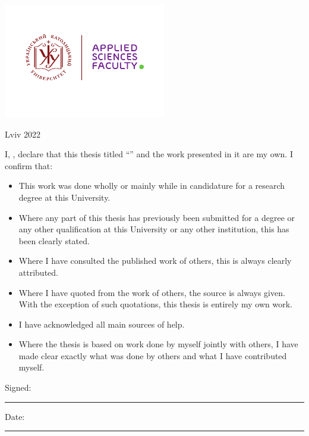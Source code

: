 \documentclass[
11pt, %
english, %
singlespacing, %
headsepline, %
]{BachelorMasterThesis} %
\begin{document}
\begin{titlepage}
\begin{center}
\vfill
\includegraphics[height=5cm]{UCU-Apps.png} %

\vfill
{\large \vspace{-0.5cm} Lviv 2022}\\[4cm] %
 
\vfill
\end{center}
\end{titlepage}


\begin{declaration}
\addchaptertocentry{\authorshipname} %
\noindent I, \authorname, declare that this thesis titled \enquote{\ttitle} and the work presented in it are my own. I confirm that:

\begin{itemize} 
\item This work was done wholly or mainly while in candidature for a research degree at this University.
\item Where any part of this thesis has previously been submitted for a degree or any other qualification at this University or any other institution, this has been clearly stated.
\item Where I have consulted the published work of others, this is always clearly attributed.
\item Where I have quoted from the work of others, the source is always given. With the exception of such quotations, this thesis is entirely my own work.
\item I have acknowledged all main sources of help.
\item Where the thesis is based on work done by myself jointly with others, I have made clear exactly what was done by others and what I have contributed myself.\\
\end{itemize}
 
\noindent Signed:\\
\rule[0.5em]{25em}{0.5pt} %
 
\noindent Date:\\
\rule[0.5em]{25em}{0.5pt} %
\end{declaration}
\end{document}
